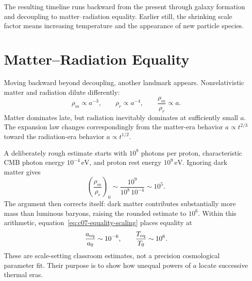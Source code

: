 \begin{classroomqa}
\end{classroomqa}

The resulting timeline runs backward from the present through galaxy formation and decoupling to matter--radiation equality. Earlier still, the shrinking scale factor means increasing temperature and the appearance of new particle species.

\section{Matter--Radiation Equality}

Moving backward beyond decoupling, another landmark appears. Nonrelativistic matter and radiation dilute differently:
\begin{equation}
\rho_m\propto a^{-3},
\qquad
\rho_r\propto a^{-4},
\qquad
\frac{\rho_m}{\rho_r}\propto a.
\label{eq:c07-equality-scaling}
\end{equation}
Matter dominates late, but radiation inevitably dominates at sufficiently small \(a\). The expansion law changes correspondingly from the matter-era behavior \(a\propto t^{2/3}\) toward the radiation-era behavior \(a\propto t^{1/2}\).

A deliberately rough estimate starts with \(10^8\) photons per proton, characteristic CMB photon energy \(10^{-4}\,\mathrm{eV}\), and proton rest energy \(10^9\,\mathrm{eV}\). Ignoring dark matter gives
\begin{equation}
\left(\frac{\rho_m}{\rho_r}\right)_0
\sim
\frac{10^9}{10^8\,10^{-4}}
\sim10^5.
\end{equation}
The argument then corrects itself: dark matter contributes substantially more mass than luminous baryons, raising the rounded estimate to \(10^6\). Within this arithmetic, equation~\eqref{eq:c07-equality-scaling} places equality at
\begin{equation}
\frac{a_{\rm eq}}{a_0}\sim10^{-6},
\qquad
\frac{T_{\rm eq}}{T_0}\sim10^6.
\label{eq:c07-equality-estimate}
\end{equation}
These are scale-setting classroom estimates, not a precision cosmological parameter fit. Their purpose is to show how unequal powers of \(a\) locate successive thermal eras.

